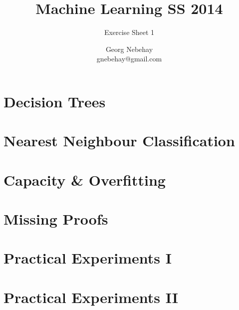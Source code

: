 \documentclass{scrartcl}
\title{Machine Learning SS 2014}
\subtitle{Exercise Sheet 1}
\author{Georg Nebehay\\gnebehay@gmail.com}
\date{}
\begin{document}
\maketitle

\section{Decision Trees}



\section{Nearest Neighbour Classification}
\section{Capacity \& Overfitting}
\section{Missing Proofs}
\section{Practical Experiments I}
\section{Practical Experiments II}

\begin{appendix}




  
\end{appendix}
  
\end{document}
